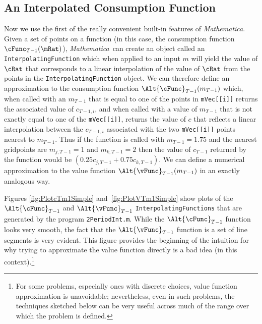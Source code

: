 \documentclass[titlepage]{\econtex}
\newcommand{\Mma}{\textit{Mathematica}}
\begin{document}
\subsection{An Interpolated Consumption Function} \label{subsec:LinInterp}

Now we use the first of the really convenient built-in features of
 {\Mma}.
Given a set of points on a function (in this case, the consumption
function $\cFunc_{T-1}(\mRat)$), {\Mma}~can create an object
called an \texttt{InterpolatingFunction} which when applied to an
input ${m}$ will yield the value of $\cRat$ that corresponds to a
linear interpolation of the value of $\cRat$ from the points in the
\texttt{InterpolatingFunction} object.  We can therefore define an 
approximation to the consumption function $\Alt{\cFunc}_{T-1}({m}_{T-1})$ which, when called with an
${m}_{T-1}$ that is equal to one of the points in
\texttt{mVec[[i]]} returns the associated value of
${c}_{T-1,i}$, and when called with a value of ${m}_{T-1}$ that
is not exactly equal to one of the \texttt{mVec[[i]]}, returns
the value of ${c}$ that reflects a linear interpolation between the
${c}_{T-1,i}$ associated with the two \texttt{mVec[[i]]}
points nearest to ${m}_{T-1}$.  Thus if the function is called with
${m}_{T-1} = 1.75$ and the nearest gridpoints
 are ${m}_{j,T-1}=1$ and
${m}_{k,T-1}=2$ then the value of ${c}_{T-1}$ returned by the
function would be $(0.25 {c}_{j,T-1}+0.75 {c}_{k,T-1})$. We
can define a numerical approximation to the value function
$\Alt{\vFunc}_{T-1}({m}_{T-1})$ in an exactly analogous way.


Figures \ref{fig:PlotcTm1Simple} and~\ref{fig:PlotVTm1Simple} show
plots of the $\Alt{\cFunc}_{T-1}$ and $\Alt{\vFunc}_{T-1}$
\texttt{InterpolatingFunctions} that are generated by the program
\texttt{2PeriodInt.m}.  While the $\Alt{\cFunc}_{T-1}$ function looks
very smooth, the fact that the $\Alt{\vFunc}_{T-1}$ function is a set
of line segments is very evident.  This figure provides the beginning
of the intuition for why trying to approximate the value function
directly is a bad idea (in this context).\footnote{For some problems,
especially ones with discrete choices, value function approximation is unavoidable;
nevertheless, even in such problems, the techniques sketched below can
be very useful across much of the range over which the problem is defined.}
\end{document}
